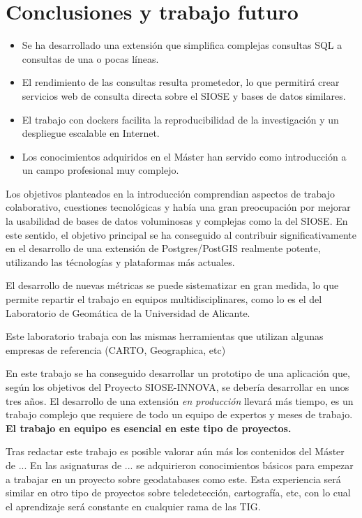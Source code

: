\chapter{Conclusiones y trabajo futuro}\label{chap:concl}

\begin{graybox}
\begin{itemize}
\item Se ha desarrollado una extensión que simplifica complejas consultas SQL a consultas de una o pocas líneas.
\item El rendimiento de las consultas resulta prometedor, lo que permitirá crear servicios web de consulta directa sobre el SIOSE y bases de datos similares.   
\item El trabajo con dockers facilita la reproducibilidad de la investigación y un despliegue escalable en Internet.
\item Los conocimientos adquiridos en el Máster han servido como introducción a un campo profesional muy complejo.
\end{itemize}
\end{graybox}

Los objetivos planteados en la introducción comprendian aspectos de trabajo colaborativo, cuestiones tecnológicas y había una gran preocupación por mejorar la usabilidad de bases de datos voluminosas y complejas como la del SIOSE. En este sentido, el objetivo principal se ha conseguido al contribuir significativamente en el desarrollo de una extensión de Postgres/PostGIS realmente potente, utilizando las técnologías y plataformas más actuales.

El desarrollo de nuevas métricas se puede sistematizar en gran medida, lo que permite repartir el trabajo en equipos multidisciplinares, como lo es el del Laboratorio de Geomática de la Universidad de Alicante.

Este laboratorio trabaja con las mismas herramientas que utilizan algunas empresas de referencia (CARTO, Geographica, etc) 

En este trabajo se ha conseguido desarrollar un prototipo de una aplicación que, según los objetivos del Proyecto SIOSE-INNOVA, se debería desarrollar en unos tres años. El desarrollo de una extensión \textit{en producción} llevará más tiempo, es un trabajo complejo que requiere de todo un equipo de expertos y meses de trabajo. \textbf{El trabajo en equipo es esencial en este tipo de proyectos.}

Tras redactar este trabajo es posible valorar aún más los contenidos del Máster de ... En las asignaturas de ... se    adquirieron conocimientos básicos para empezar a trabajar en un proyecto sobre geodatabases como este. Esta experiencia será similar en otro tipo de proyectos sobre teledetección, cartografía, etc, con lo cual el aprendizaje será constante en cualquier rama de las TIG.
